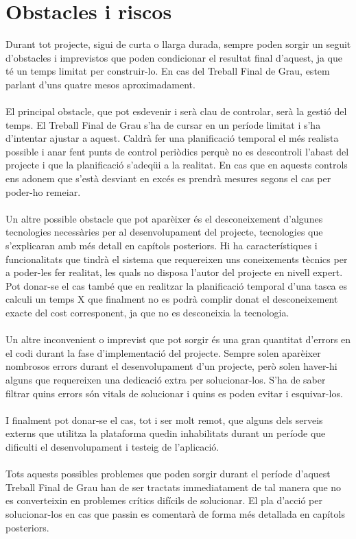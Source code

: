 
\section{Obstacles i riscos}

Durant tot projecte, sigui de curta o llarga durada, sempre poden sorgir un seguit d'obstacles i imprevistos que poden condicionar el resultat final d'aquest, ja que té un temps limitat per construir-lo. En cas del Treball Final de Grau, estem parlant d'uns quatre mesos aproximadament.
\\\\
El principal obstacle, que pot esdevenir i serà clau de controlar, serà la gestió del temps. El Treball Final de Grau s'ha de cursar en un període limitat i s'ha d'intentar ajustar a aquest. Caldrà fer una planificació temporal el més realista possible i anar fent punts de control periòdics perquè no es descontroli l'abast del projecte i que la planificació s'adeqüi a la realitat. En cas que en aquests controls ens adonem que s'està desviant en excés es prendrà mesures segons el cas per poder-ho remeiar.
\\\\
Un altre possible obstacle que pot aparèixer és el desconeixement d'algunes tecnologies necessàries per al desenvolupament del projecte, tecnologies que s'explicaran amb més detall en capítols posteriors. Hi ha característiques i funcionalitats que tindrà el sistema que requereixen uns coneixements tècnics per a poder-les fer realitat, les quals no disposa l'autor del projecte en nivell expert. Pot donar-se el cas també que en realitzar la planificació temporal d'una tasca es calculi un temps X que finalment no es podrà complir donat el desconeixement exacte del cost corresponent, ja que no es desconeixia la tecnologia.
\\\\
Un altre inconvenient o imprevist que pot sorgir és una gran quantitat d'errors en el codi durant la fase d'implementació del projecte. Sempre solen aparèixer nombrosos errors durant el desenvolupament d'un projecte, però solen haver-hi alguns que requereixen una dedicació extra per solucionar-los. S'ha de saber filtrar quins errors són vitals de solucionar i quins es poden evitar i esquivar-los.
\\\\
I finalment pot donar-se el cas, tot i ser molt remot, que alguns dels serveis externs que utilitza la plataforma quedin inhabilitats durant un període que dificulti el desenvolupament i testeig de l'aplicació.
\\\\
Tots aquests possibles problemes que poden sorgir durant el període d'aquest Treball Final de Grau han de ser tractats immediatament de tal manera que no es converteixin en problemes crítics difícils de solucionar. El pla d'acció per solucionar-los en cas que passin es comentarà de forma més detallada en capítols posteriors.

